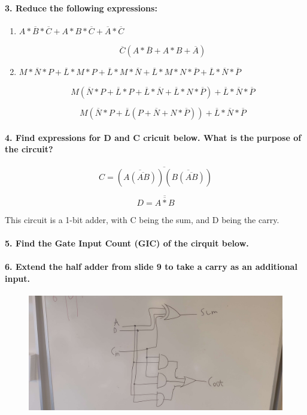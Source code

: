 \documentclass{article}
\begin{document}
\paragraph{3. Reduce the following expressions:}

\begin{enumerate}
	\item $A * \overline{B} * \overline{C} + A * B * \overline{C} + \overline{A} * \overline{C}$

	$$\overline{C}(A * \overline{B} + A * B + \overline{A})$$

	\item $M * \overline{N} * P + \overline{L} * M * P + \overline{L} * M * \overline{N} + \overline{L} * M * N * \overline{P} + \overline{L} * \overline{N} * \overline{P}$

	$$M(\overline{N}*P+\overline{L}*P+\overline{L}*\overline{N}+\overline{L}*N*\overline{P})+\overline{L}*\overline{N}*\overline{P}$$

	$$M(\overline{N}*P+\overline{L}(P+\overline{N}+N*\overline{P}))+\overline{L}*\overline{N}*\overline{P}$$
\end{enumerate}

\paragraph{4. Find expressions for D and C cricuit below. What is the purpose of the circuit?}

$$C = \overline{(\overline{A(\overline{AB})})(\overline{B(\overline{AB})})}$$

$$D = \overline{\overline{A*B}}$$

This circuit is a 1-bit adder, with C being the sum, and D being the carry.

\paragraph{5. Find the Gate Input Count (GIC) of the cirquit below.}

\paragraph{6. Extend the half adder from slide 9 to take a carry as an additional input.}

\begin{figure}[H]
	\centering
	\includegraphics[width=\textwidth]{fullAdder.png}
\end{figure}
\end{document}
